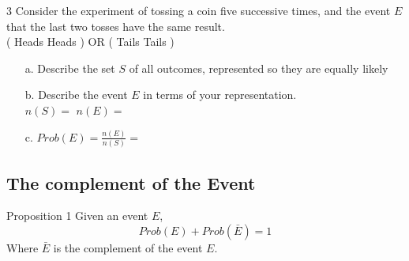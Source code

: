 \documentclass[a4paper,12pt]{book}
\newcounter{question}
\begin{document}
        \hrulefill

        \begin{question}{\thequestion}{3}
            Consider the experiment of tossing a coin five successive
            times, and the event $E$ that the last two tosses have the same result. \\
            ( \fitb[0.5cm] \fitb[0.5cm] \fitb[0.5cm] Heads Heads ) OR
            ( \fitb[0.5cm] \fitb[0.5cm] \fitb[0.5cm] Tails Tails )
            
            \begin{enumerate}
                \item[a.] Describe the set $S$ of all outcomes, represented
                so they are equally likely
                
                \item[b.] Describe the event $E$ in terms of your representation. \\
                $n(S) = $  \tab
                $n(E) = $ 
                
                \item[c.] $Prob(E) = \frac{n(E)}{n(S)} = $
            \end{enumerate}
        \end{question}

    \newpage
    
    \subsection{The complement of the Event}
    
        \begin{intro}{Proposition 1}
            Given an event $E$,
            $$ Prob(E) + Prob(\bar{E}) = 1 $$
            Where $\bar{E}$ is the complement of the event $E$.
        \end{intro}
\end{document}
